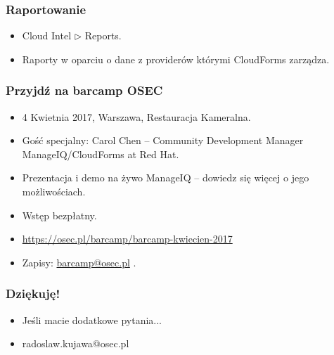 \documentclass[dvipsnames,table]{beamer}
\newcommand{\tri}{$\triangleright$ }
\begin{document}
\begin{frame}
\frametitle{Raportowanie}
\begin{itemize}
	\item Cloud Intel \tri Reports.
	\item Raporty w oparciu o dane z providerów którymi CloudForms zarządza. 
\end{itemize}
\end{frame}

\begin{frame}
\frametitle{Przyjdź na barcamp OSEC}
\begin{itemize}
	\item 4 Kwietnia 2017, Warszawa, Restauracja Kameralna.
	\item Gość specjalny: Carol Chen -- Community Development Manager ManageIQ/CloudForms at Red Hat.
	\item Prezentacja i demo na żywo ManageIQ -- dowiedz się więcej o jego możliwościach.
	\item Wstęp bezpłatny.
	\item \url{https://osec.pl/barcamp/barcamp-kwiecien-2017}
	\item Zapisy: \href{mailto:barcamp@osec.pl}{barcamp@osec.pl} .
\end{itemize}
\end{frame}

\begin{frame}
\frametitle{Dziękuję!}
\begin{itemize}
	\item Jeśli macie dodatkowe pytania...
	\item radoslaw.kujawa@osec.pl
\end{itemize}
\end{frame}
\end{document}
